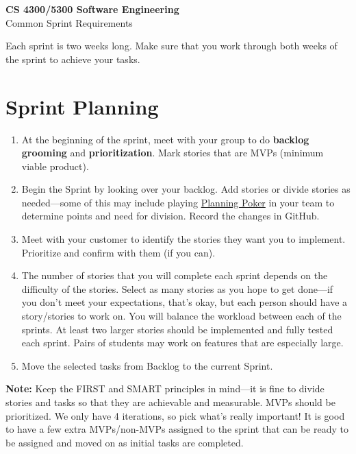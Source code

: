 \documentclass[11pt]{article}
\begin{document}
\begin{center}
{\LARGE\textbf{CS 4300/5300 Software Engineering}}\\[0.5em]
{\Large Common Sprint Requirements}\\[1em]
\end{center}

Each sprint is two weeks long. Make sure that you work through both weeks of the sprint to achieve your tasks.

\section{Sprint Planning}

\begin{enumerate}
    \item At the beginning of the sprint, meet with your group to do \textbf{backlog grooming} and \textbf{prioritization}. Mark stories that are MVPs (minimum viable product).
    
    \item Begin the Sprint by looking over your backlog. Add stories or divide stories as needed---some of this may include playing \href{https://www.atlassian.com/blog/platform/scrum-poker-for-agile-projects}{Planning Poker} in your team to determine points and need for division. Record the changes in GitHub.
    
    \item Meet with your customer to identify the stories they want you to implement. Prioritize and confirm with them (if you can).
    
    \item The number of stories that you will complete each sprint depends on the difficulty of the stories. Select as many stories as you hope to get done---if you don't meet your expectations, that's okay, but each person should have a story/stories to work on. You will balance the workload between each of the sprints. At least two larger stories should be implemented and fully tested each sprint. Pairs of students may work on features that are especially large.
    
    \item Move the selected tasks from Backlog to the current Sprint.
    
\end{enumerate}

\textbf{Note:} Keep the FIRST and SMART principles in mind---it is fine to divide stories and tasks so that they are achievable and measurable. MVPs should be prioritized. We only have 4 iterations, so pick what's really important! It is good to have a few extra MVPs/non-MVPs assigned to the sprint that can be ready to be assigned and moved on as initial tasks are completed.
\end{document}

